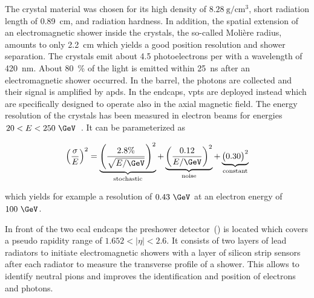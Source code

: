 
The crystal material was chosen for its high density of $8.28~\mathrm{g}/\mathrm{cm}^{3}$, short radiation length of 0.89~cm, and radiation hardness. In addition, the spatial extension of an electromagnetic shower inside the crystals, the so-called Moli\`ere radius, amounts to only 2.2~cm which yields a good position resolution and shower separation. The crystals emit about 4.5 photoelectrons per \MeV with a wavelength of 420~nm. About 80~\% of the light is emitted within 25~ns after an electromagnetic shower occurred. In the barrel, the photons are collected and their signal is amplified by \glspl{apd}. In the endcaps, \glspl{vpt} are deployed instead which are specifically designed to operate also in the axial magnetic field. The energy resolution of the crystals has been measured in electron beams for energies $20<E<250~\GeV$~\cite{Adzic:2007mi}. It can be parameterized as

\begin{equation}
\left(\frac{\sigma}{E}\right)^{2}=\underbrace{\left(\frac{2.8\%}{\sqrt{E/\GeV}}\right)^{2}}_\text{stochastic}+\underbrace{\left(\frac{0.12}{E/\GeV}\right)^{2}}_\text{noise}+\underbrace{\big(0.30\big)^{2}}_\text{constant}
\end{equation}

which yields for example a resolution of $0.43~\GeV$ at an electron energy of $100~\GeV$.

In front of the two \gls{ecal} endcaps the preshower detector~() is located which covers a pseudo rapidity range of $1.652<|\eta|<2.6$. It consists of two layers of lead radiators to initiate electromagnetic showers with a layer of silicon strip sensors after each radiator to measure the transverse profile of a shower. This allows to identify neutral pions and improves the identification and position of electrons and photons. 


